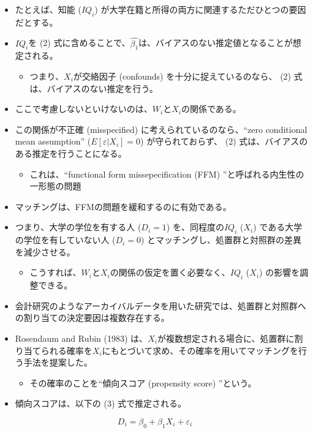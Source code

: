 \begin{itemize}
 \item たとえば、知能 ($IQ_i$) が大学在籍と所得の両方に関連するただひとつの要因だとする。
 \item $IQ_i$を (2) 式に含めることで、$\hat{\beta_1}$は、バイアスのない推定値となることが想定される。
  \begin{itemize}
   \item つまり、$X_i$が交絡因子 (confounds) を十分に捉えているのなら、 (2) 式は、バイアスのない推定を行う。
  \end{itemize}
 \item ここで考慮しないといけないのは、$W_i$と$X_i$の関係である。
 \item この関係が不正確 (misspecified) に考えられているのなら、“zero conditional mean assumption” ($E[\varepsilon | X_i] = 0$) が守られておらず、 (2) 式は、バイアスのある推定を行うことになる。
       \begin{itemize}
        \item これは、``functional form missepecification (FFM) ''と呼ばれる内生性の一形態の問題
       \end{itemize}
 \item マッチングは、FFMの問題を緩和するのに有効である。
 \item つまり、大学の学位を有する人 ($D_i=1$) を、同程度の$IQ_i$ ($X_i$) である大学の学位を有していない人 ($D_i=0$) とマッチングし、処置群と対照群の差異を減少させる。
  \begin{itemize}
   \item こうすれば、$W_i$と$X_i$の関係の仮定を置く必要なく、$IQ_i$ ($X_i$) の影響を調整できる。
  \end{itemize}
 \item 会計研究のようなアーカイバルデータを用いた研究では、処置群と対照群への割り当ての決定要因は複数存在する。
 \item Rosendaum and Rubin (1983) は、$X_i$が複数想定される場合に、処置群に割り当てられる確率を$X_i$にもとづいて求め、その確率を用いてマッチングを行う手法を提案した。
  \begin{itemize}
   \item その確率のことを``傾向スコア (propensity score) ''という。
  \end{itemize}
\item 傾向スコアは、以下の (3) 式で推定される。
\end{itemize}

\begin{equation}
D_i = \beta_0 + \beta_1 X_i + \varepsilon_i
\end{equation}

